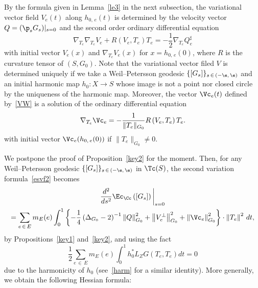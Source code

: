 \begin{rema}
By the formula given in Lemma~\ref{le3} in the next subsection, the variational vector field $V_e(t)$ along $h_{0,\,e}(t)$ is determined by the velocity vector $Q=(\p_sG_s)|_{s=0}$ and the second order ordinary differential equation
\begin{equation}\label{deqv1}
\nabla_{T_e}\nabla_{T_e}V_e+R\left(V_e, T_e\right)T_e=-\frac{1}{2}\nabla_{T_e}Q_e^{\sharp}
\end{equation}
with initial vector $V_e(x)$ and $\nabla_{T_e}V_e(x)$ for $x=h_{0,\,e}(0)$, where $R$ is the curvature tensor of $(S,G_0)$. Note that the variational vector filed $V$ is determined uniquely if we take a Weil--Petersson geodesic $\{[G_s]\}_{s\,\in\,(-\e, \,\e)}$ and an initial harmonic map $h_0: X\to S$ whose image is not a point nor closed circle by the uniqueness of the harmonic map. Moreover, the vector $\Vc_e(t)$ defined by~\eqref{VW} is a solution of the ordinary differential equation
\begin{equation}\label{deqv2}
\nabla_{T_e}\Vc_e=-\frac{1}{\|T_e\|_{G_0}}R\left(V_e,T_e\right)T_e.
\end{equation}
with initial vector $\Vc_e(h_{0,\,e}(0))$ if $\|T_e\|_{G_0}\neq 0$.
\end{rema}




We postpone the proof of Proposition~\ref{key2} for the moment. Then, for any Weil--Petersson geodesic $\{[G_s]\}_{s\,\in \,(-\e,\,\e)}$ in $\Tc(S)$, the second variation formula~\eqref{esvf2} becomes
\begin{multline}\label{svff}
\frac{d^2}{d s^2}\Ec_{\Cc}\left([G_{s}]\right)\bigg|_{s=0}\\
=\sum_{e\,\in\,E}m_E(e)\int_0^1\left\{-\frac{1}{4}\left(\Delta_{G_0}-2\right)^{-1}\left\|Q\right\|_{G_0}^2+\left\|V_e^{\perp}\right\|_{G_0}^2+\left\|\Vc_e\right\|_{G_0}^2\right\}\cdot \left\|T_e\right\|^2\,dt,
\end{multline}
by Propositions~\ref{key1} and~\ref{key2}, and using the fact
\[
\frac{1}{2}\sum_{e\,\in\,E}m_E(e)\int_0^1 h_0^*L_ZG\left(T_e,T_e\right)dt=0
\]
due to the harmonicity of $h_0$ (see~\eqref{harm} for a similar identity). More generally, we obtain the following Hessian formula:

